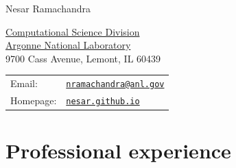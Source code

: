 \documentclass[letterpaper]{article}
\def\name{Nesar Ramachandra}
\begin{document}
{\huge \name}


\vspace{0.25in}

\begin{minipage}{0.45\linewidth}
  \href{https://www.anl.gov/cps}{Computational Science Division} \\
  \href{https://www.anl.gov}{Argonne National Laboratory} \\
  9700 Cass Avenue, Lemont, IL 60439
\end{minipage}
\begin{minipage}{0.45\linewidth}
  \begin{tabular}{ll}
    Email: & \href{mailto:nramachandra@anl.gov}{\tt nramachandra@anl.gov} \\
    Homepage: & \href{https://nesar.github.io/}{\tt nesar.github.io} \\
  \end{tabular}
\end{minipage}


\section*{Professional experience}
\end{document}
